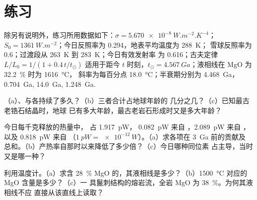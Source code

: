 \section*{练习}\label{sec:b2:precambrian-earth:exercises}

除另有说明外，练习所用数据如下：$\sigma = \qty{5.670e-8}{W.m^{-2}.K^{-4}}$；
$S_0 = \qty{1361}{W.m^{-2}}$；今日反照率为 0.294，地表平均温度为 \qty{288}{K}；
雪球反照率为 0.6；过渡段从 \qty{263}{K} 到 \qty{283}{K}；今日有效发射率
为 0.616；古夫定律 $L/L_0 = 1/(1 + 0.4\,t/t_\odot)$ 适用于距今 $t$ 时刻，$t_\odot =
\qty{4.567}{Ga}$；液相线在 MgO 为 \qty{32.2}{\percent} 时为 \qty{1616}{\celsius}，
斜率为每百分点 \qty{18.0}{\celsius}；半衰期分别为  \qty{4.468}{Ga}，
\qty{0.704}{Ga},  \qty{14.0}{Ga},  \qty{1.248}{Ga}.

\begin{exercise}[$\star$]\label{exo:b2:precambrian-earth:1}
（a）、与各持续了多久？（b）三者合计占地球年龄的
几分之几？（c）已知最古老锆石结晶时，地球
已有多大年龄，最古老岩石形成时又是多大年龄？
\end{exercise}

\begin{exercise}[$\star$]\label{exo:b2:precambrian-earth:2}
今日每千克释放的热量中， 占 \qty{1.917}{pW}，
\qty{0.082}{pW} 来自 ，\qty{2.089}{pW} 来自 ，以及 \qty{0.818}{pW} 来自
（$\qty{1}{pW} = \qty{e-12}{W}$）。（a）求各项在 \qty{3}{Ga} 前的贡献及
总和。（b）产热率自那时以来降低了多少倍？（c）今日哪种同位素
占主导，当时又是哪一种？
\end{exercise}

\begin{exercise}[$\star$]\label{exo:b2:precambrian-earth:3}
利用温度计。（a）求含
\qty{28}{\percent} MgO 的，其液相线是多少？（b）\qty{1500}{\celsius} 对应的 MgO 含量是多少？（c）一
具鬣刺结构的熔岩流，全岩 MgO 为 \qty{38}{\percent}。为何其液相线不应
直接从该直线上读取？
\end{exercise}

